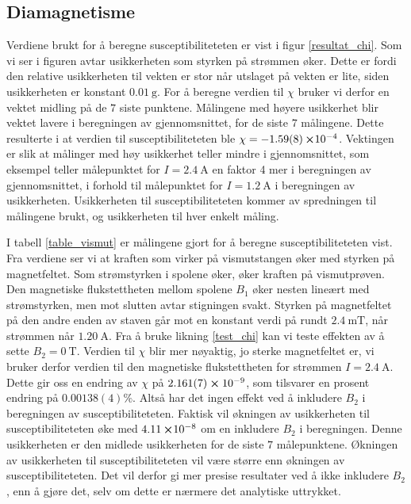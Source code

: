 \documentclass[%
 reprint,
 amsmath,amssymb,
 aps,
 norsk,
]{revtex4-1}
\begin{document}
\subsection{Diamagnetisme}
Verdiene brukt for å beregne susceptibiliteteten er vist i figur \vref{resultat_chi}. Som vi ser i figuren avtar usikkerheten som styrken på strømmen øker. Dette er fordi den relative usikkerheten til vekten er stor når utslaget på vekten er lite, siden usikkerheten er konstant $\SI{0.01}{\gram}$. For å beregne verdien til $\chi$ bruker vi derfor en vektet midling på de $7$ siste punktene. Målingene med høyere usikkerhet blir vektet lavere i beregningen av gjennomsnittet, for de siste $7$ målingene. Dette resulterte i at verdien til susceptibiliteteten ble $\chi = -\SI{1.59\pm0.08}\cross 10^{-4}$. Vektingen er slik at målinger med høy usikkerhet teller mindre i gjennomsnittet, som eksempel teller målepunktet for $I=\SI{2.4}{\ampere}$ en faktor 4 mer i beregningen av gjennomsnittet, i forhold til målepunktet for $I=\SI{1.2}{\ampere}$ i beregningen av usikkerheten. Usikkerheten til susceptibiliteteten kommer av spredningen til målingene brukt, og usikkerheten til hver enkelt måling.\par
I tabell \vref{table_vismut} er målingene gjort for å beregne susceptibiliteteten vist. Fra verdiene ser vi at kraften som virker på vismutstangen øker med styrken på magnetfeltet. Som strømstyrken i spolene øker, øker kraften på vismutprøven. Den magnetiske flukstettheten mellom spolene $B_1$ øker nesten lineært med strømstyrken, men mot slutten avtar stigningen svakt. Styrken på magnetfeltet på den andre enden av staven går mot en konstant verdi på rundt $\SI{2.4}{\milli\tesla}$, når strømmen når $\SI{1.20}{\ampere}$. Fra å bruke likning \eqref{test_chi} kan vi teste effekten av å sette $B_2=\SI{0}{\tesla}$. Verdien til $\chi$ blir mer nøyaktig, jo sterke magnetfeltet er, vi bruker derfor verdien til den magnetiske flukstettheten for strømmen $I=\SI{2.4}{\ampere}$. Dette gir oss en endring av $\chi$
på $2.161(7)\cross10^{-9}$, som tilsvarer en prosent endring på $0.00138(4)\%$. Altså har det ingen effekt ved å inkludere $B_2$ i beregningen av susceptibiliteteten. Faktisk vil økningen av usikkerheten til susceptibiliteteten øke med $\SI{4.11}\cross 10^{-8}$ om en inkludere $B_2$ i beregningen. Denne usikkerheten er den midlede usikkerheten for de siste $7$ målepunktene. Økningen av usikkerheten til susceptibiliteteten vil være større enn økningen av susceptibiliteteten. Det vil derfor gi mer presise resultater ved å ikke inkludere $B_2$, enn å gjøre det, selv om dette er nærmere det analytiske uttrykket. \\
\end{document}
